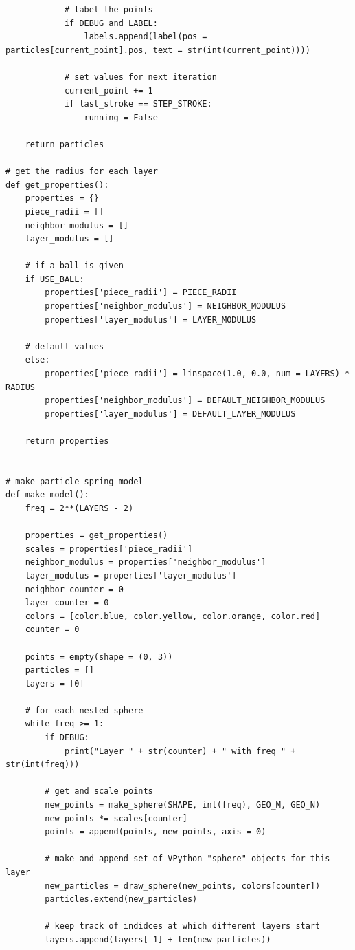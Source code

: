 \documentclass{article}
\begin{document}
\begin{verbatim}
            # label the points
            if DEBUG and LABEL:
                labels.append(label(pos = particles[current_point].pos, text = str(int(current_point))))

            # set values for next iteration
            current_point += 1
            if last_stroke == STEP_STROKE:
                running = False

    return particles

# get the radius for each layer
def get_properties():
    properties = {}
    piece_radii = []
    neighbor_modulus = []
    layer_modulus = []
    
    # if a ball is given
    if USE_BALL:
        properties['piece_radii'] = PIECE_RADII
        properties['neighbor_modulus'] = NEIGHBOR_MODULUS
        properties['layer_modulus'] = LAYER_MODULUS

    # default values
    else:   
        properties['piece_radii'] = linspace(1.0, 0.0, num = LAYERS) * RADIUS
        properties['neighbor_modulus'] = DEFAULT_NEIGHBOR_MODULUS
        properties['layer_modulus'] = DEFAULT_LAYER_MODULUS

    return properties


# make particle-spring model
def make_model():
    freq = 2**(LAYERS - 2)

    properties = get_properties()
    scales = properties['piece_radii']
    neighbor_modulus = properties['neighbor_modulus']
    layer_modulus = properties['layer_modulus']
    neighbor_counter = 0
    layer_counter = 0
    colors = [color.blue, color.yellow, color.orange, color.red]
    counter = 0
    
    points = empty(shape = (0, 3))
    particles = []
    layers = [0]
    
    # for each nested sphere
    while freq >= 1:
        if DEBUG:
            print("Layer " + str(counter) + " with freq " + str(int(freq)))
        
        # get and scale points
        new_points = make_sphere(SHAPE, int(freq), GEO_M, GEO_N)
        new_points *= scales[counter]
        points = append(points, new_points, axis = 0)

        # make and append set of VPython "sphere" objects for this layer
        new_particles = draw_sphere(new_points, colors[counter])
        particles.extend(new_particles)

        # keep track of indidces at which different layers start
        layers.append(layers[-1] + len(new_particles))
                          

\end{verbatim}
\end{document}
